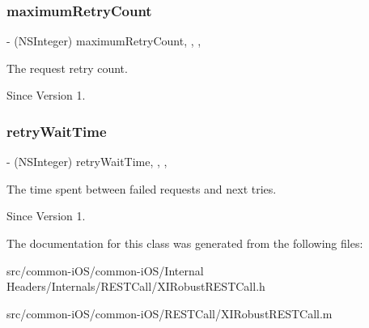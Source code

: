 \subsubsection{\texorpdfstring{maximum\+Retry\+Count}{maximumRetryCount}}
{\footnotesize\ttfamily -\/ (N\+S\+Integer) maximum\+Retry\+Count\hspace{0.3cm}{\ttfamily [read]}, {\ttfamily [write]}, {\ttfamily [nonatomic]}, {\ttfamily [assign]}}



The request retry count. 

\begin{DoxySince}{Since}
Version 1. 
\end{DoxySince}
\hypertarget{interface_x_i_robust_r_e_s_t_call_aaf805da47865acca300f8fd2e6823d61}{}\label{interface_x_i_robust_r_e_s_t_call_aaf805da47865acca300f8fd2e6823d61} 
\subsubsection{\texorpdfstring{retry\+Wait\+Time}{retryWaitTime}}
{\footnotesize\ttfamily -\/ (N\+S\+Integer) retry\+Wait\+Time\hspace{0.3cm}{\ttfamily [read]}, {\ttfamily [write]}, {\ttfamily [nonatomic]}, {\ttfamily [assign]}}



The time spent between failed requests and next tries. 

\begin{DoxySince}{Since}
Version 1. 
\end{DoxySince}


The documentation for this class was generated from the following files\+:\begin{DoxyCompactItemize}
\item 
src/common-\/i\+O\+S/common-\/i\+O\+S/\+Internal Headers/\+Internals/\+R\+E\+S\+T\+Call/X\+I\+Robust\+R\+E\+S\+T\+Call.\+h\item 
src/common-\/i\+O\+S/common-\/i\+O\+S/\+R\+E\+S\+T\+Call/X\+I\+Robust\+R\+E\+S\+T\+Call.\+m\end{DoxyCompactItemize}
